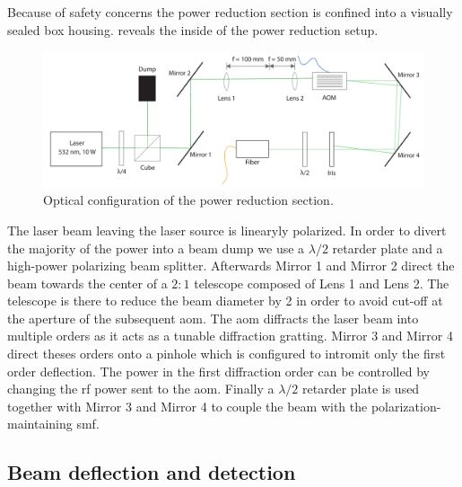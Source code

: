 Because of safety concerns the power reduction section is confined into a
visually sealed box housing.  reveals the
inside of the power reduction setup.
\begin{figure}[htb]
  \centering
  \includegraphics[width=\textwidth]{../figure/setup/power-reduction.pdf}
  \caption{Optical configuration of the power reduction section.
  }\label{fig:setup_power_reduction}
\end{figure}
The laser beam leaving the laser source is linearyly polarized. In order to
divert the majority of the power into a beam dump we use a $\lambda/2$
retarder plate and a high-power polarizing beam splitter. Afterwards Mirror
\num{1} and Mirror \num{2} direct the beam towards the center of a $2:1$
telescope composed of Lens \num{1} and Lens \num{2}. The telescope is there to
reduce the beam diameter by \num{2} in order to avoid cut-off at the aperture
of the subsequent \gls{aom}. The \gls{aom} diffracts the laser beam into
multiple orders as it acts as a tunable diffraction gratting. Mirror \num{3}
and Mirror \num{4} direct theses orders onto a pinhole which is configured to
intromit only the first order deflection. The power in the first diffraction
order can be controlled by changing the \gls{rf} power sent to the \gls{aom}.
Finally a $\lambda/2$ retarder plate is used together with Mirror \num{3} and
Mirror \num{4} to couple the beam with the polarization-maintaining \gls{smf}.

\subsection{Beam deflection and detection}\label{subsec:setup_deflection_detection}


